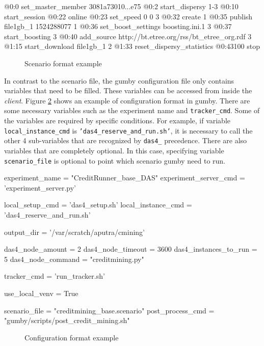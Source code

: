 \begin{verbbox}
@0:0 set_master_member 3081a73010...e75
@0:2 start_dispersy {1-3}
@0:10 start_session
@0:22 online
@0:23 set_speed 0 0 {3}
@0:32 create {1}
@0:35 publish file1gb_1 1524288077 {1}
@0:36 set_boost_settings boosting.ini.1 {3}
@0:37 start_boosting {3}
@0:40 add_source http://bt.etree.org/rss/bt_etree_org.rdf {3}
@1:15 start_download file1gb_1 {2}
@1:33 reset_dispersy_statistics
@0:43100 stop
\end{verbbox}

\begin{figure}[h]
	\fbox{\theverbbox}
	\caption{Scenario format example}
	\label{fig:gumbyscenario}
\end{figure}

In contrast to the scenario file, the gumby configuration file only contains variables that need to be filled. These variables can be accessed from inside the \textit{client}. Figure \ref{fig:gumbyconf} shows an example of configuration format in gumby. There are some necessary variables such as the experiment name and \texttt{tracker\_cmd}. Some of the variables are required by specific conditions. For example, if variable \texttt{local\_instance\_cmd} is \texttt{'das4\_reserve\_and\_run.sh'}, it is necessary to call the other 4 sub-variables that are recognized by \texttt{das4\_} precedence. There are also variables that are completely optional. In this case, specifying variable \texttt{scenario\_file} is optional to point which scenario gumby need to run.

\begin{verbbox}
experiment_name = "CreditRunner_base_DAS"
experiment_server_cmd = 'experiment_server.py'

local_setup_cmd = 'das4_setup.sh'
local_instance_cmd = 'das4_reserve_and_run.sh'

output_dir = '/var/scratch/aputra/cmining'

das4_node_amount = 2
das4_node_timeout = 3600
das4_instances_to_run = 5
das4_node_command = "creditmining.py"

tracker_cmd = 'run_tracker.sh'

use_local_venv = True

scenario_file = "creditmining_base.scenario"
post_process_cmd = "gumby/scripts/post_credit_mining.sh"
\end{verbbox}

\begin{figure}[h!]
	\fbox{\theverbbox}
	\caption{Configuration format example}
	\label{fig:gumbyconf}
\end{figure}


